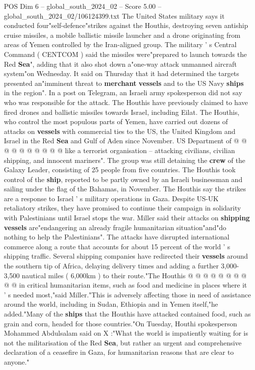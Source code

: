 \begin{textsample}{POS Dim 6 – global\_south\_2024\_02 – Score 5.00 – global\_south\_2024\_02/106124399.txt}  \label{ex:f6_pos_185}
The United States military says it conducted four"self-defence"strikes against the Houthis, destroying seven antiship cruise missiles, a mobile ballistic missile launcher and a drone originating from areas of Yemen controlled by the Iran-aligned group.
The military ' s Central Command ( CENTCOM ) said the missiles were"prepared to launch towards the Red \textbf{Sea}", adding that it also shot down a"one-way attack unmanned aircraft system"on Wednesday.
It said on Thursday that it had determined the targets presented an"imminent threat to \textbf{merchant} \textbf{vessels} and to the US Navy \textbf{ships} in the region".
In a post on Telegram, an Israeli army spokesperson did not say who was responsible for the attack.
The Houthis have previously claimed to have fired drones and ballistic missiles towards Israel, including Eilat.
The Houthis, who control the most populous parts of Yemen, have carried out dozens of attacks on \textbf{vessels} with commercial ties to the US, the United Kingdom and Israel in the Red \textbf{Sea} and Gulf of Aden since November.
US Department of @ @ @ @ @ @ @ @ @ @ like a terrorist organisation -- attacking civilians, civilian shipping, and innocent mariners".
The group was still detaining the \textbf{crew} of the Galaxy Leader, consisting of 25 people from five countries.
The Houthis took control of the \textbf{ship}, reported to be partly owned by an Israeli businessman and sailing under the flag of the Bahamas, in November.
The Houthis say the strikes are a response to Israel ' s military operations in Gaza.
Despite US-UK retaliatory strikes, they have promised to continue their campaign in solidarity with Palestinians until Israel stops the war.
Miller said their attacks on \textbf{shipping} \textbf{vessels} are"endangering an already fragile humanitarian situation"and"do nothing to help the Palestinians".
The attacks have disrupted international commerce along a route that accounts for about 15 percent of the world ' s shipping traffic.
Several shipping companies have redirected their \textbf{vessels} around the southern tip of Africa, delaying delivery times and adding a further 3,000-3,500 nautical miles ( 6,000km ) to their route."The Houthis @ @ @ @ @ @ @ @ @ @ in critical humanitarian items, such as food and medicine in places where it ' s needed most,"said Miller."This is adversely affecting those in need of assistance around the world, including in Sudan, Ethiopia and in Yemen itself,"he added."Many of the \textbf{ships} that the Houthis have attacked contained food, such as grain and corn, headed for those countries."On Tuesday, Houthi spokesperson Mohammed Abdulsalam said on X :"What the world is impatiently waiting for is not the militarisation of the Red \textbf{Sea}, but rather an urgent and comprehensive declaration of a ceasefire in Gaza, for humanitarian reasons that are clear to anyone."

\end{textsample}
